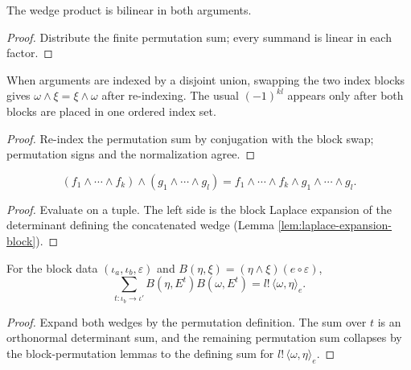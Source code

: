 \begin{lemma}
\label{lem:wedge-bilinear}
\leanok
{}
The wedge product is bilinear in both arguments.
\end{lemma}
\begin{proof}
\leanok
\sketch Distribute the finite permutation sum; every summand is linear in each factor.
\end{proof}

\begin{lemma}
\label{lem:wedge-comm-sum}
\leanok
{}
When arguments are indexed by a disjoint union, swapping the two index blocks gives $\omega\wedge\xi=\xi\wedge\omega$ after re-indexing. The usual $(-1)^{kl}$ appears only after both blocks are placed in one ordered index set.
\end{lemma}
\begin{proof}
\leanok
\sketch Re-index the permutation sum by conjugation with the block swap; permutation signs and the normalization agree.
\end{proof}

\begin{lemma}
\label{lem:wedge-covectors-concat}
\leanok
{}
\[
(f_1\wedge\cdots\wedge f_k)\wedge(g_1\wedge\cdots\wedge g_l)=f_1\wedge\cdots\wedge f_k\wedge g_1\wedge\cdots\wedge g_l.
\]
\end{lemma}
\begin{proof}
\leanok
{}
\sketch Evaluate on a tuple. The left side is the block Laplace expansion of the determinant defining the concatenated wedge (Lemma \ref{lem:laplace-expansion-block}).
\end{proof}

\begin{lemma}
\label{lem:hodge-scalar-identity}
\leanok
{}
For the block data $(\iota_a,\iota_b,\varepsilon)$ and $B(\eta,\xi)=(\eta\wedge\xi)(e\circ\varepsilon)$,
\[
\sum_{t:\iota_b\to\iota'}B(\eta,E^t)B(\omega,E^t)=l!\,\langle\omega,\eta\rangle_e.
\]
\end{lemma}
\begin{proof}
\leanok
\sketch Expand both wedges by the permutation definition. The sum over $t$ is an orthonormal determinant sum, and the remaining permutation sum collapses by the block-permutation lemmas to the defining sum for $l!\,\langle\omega,\eta\rangle_e$.
\end{proof}

